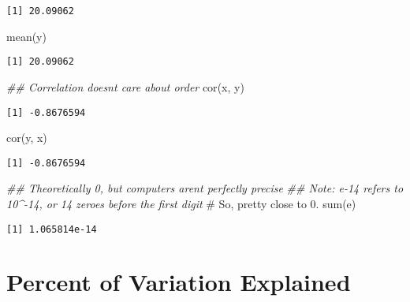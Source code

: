 \documentclass[
  letterpaper,
  DIV=11,
  numbers=noendperiod]{scrreprt}
\newenvironment{Shaded}{\begin{snugshade}}{\end{snugshade}}
\newcommand{\CommentTok}[1]{\textcolor[rgb]{0.37,0.37,0.37}{#1}}
\newcommand{\DocumentationTok}[1]{\textcolor[rgb]{0.37,0.37,0.37}{\textit{#1}}}
\newcommand{\FunctionTok}[1]{\textcolor[rgb]{0.28,0.35,0.67}{#1}}
\newcommand{\NormalTok}[1]{\textcolor[rgb]{0.00,0.23,0.31}{#1}}
\begin{document}
\begin{verbatim}
[1] 20.09062
\end{verbatim}

\begin{Shaded}
\begin{Highlighting}[]
\FunctionTok{mean}\NormalTok{(y)}
\end{Highlighting}
\end{Shaded}

\begin{verbatim}
[1] 20.09062
\end{verbatim}

\begin{Shaded}
\begin{Highlighting}[]
\DocumentationTok{\#\# Correlation doesn\textquotesingle{}t care about order}
\FunctionTok{cor}\NormalTok{(x, y)}
\end{Highlighting}
\end{Shaded}

\begin{verbatim}
[1] -0.8676594
\end{verbatim}

\begin{Shaded}
\begin{Highlighting}[]
\FunctionTok{cor}\NormalTok{(y, x)}
\end{Highlighting}
\end{Shaded}

\begin{verbatim}
[1] -0.8676594
\end{verbatim}

\begin{Shaded}
\begin{Highlighting}[]
\DocumentationTok{\#\# Theoretically 0, but computers aren\textquotesingle{}t perfectly precise}
\DocumentationTok{\#\# Note: e{-}14 refers to 10\^{}{-}14, or 14 zeroes before the first digit}
    \CommentTok{\# So, pretty close to 0.}
\FunctionTok{sum}\NormalTok{(e) }
\end{Highlighting}
\end{Shaded}

\begin{verbatim}
[1] 1.065814e-14
\end{verbatim}

\hypertarget{percent-of-variation-explained}{%
\section{Percent of Variation
Explained}\label{percent-of-variation-explained}}
\end{document}
